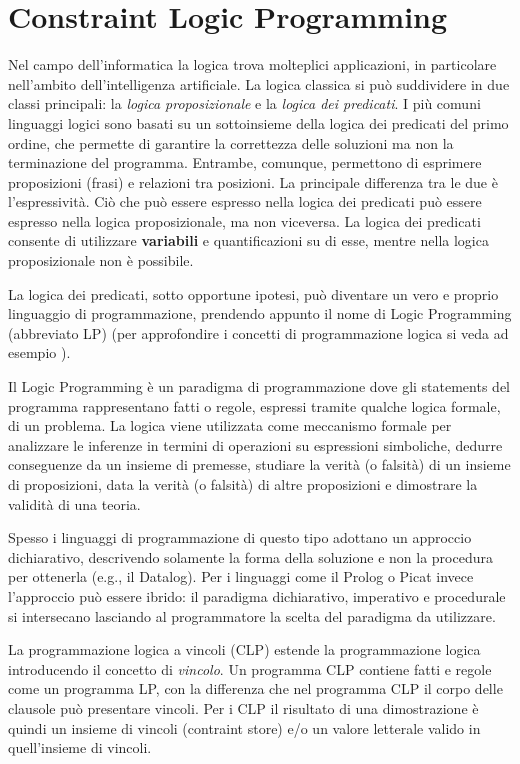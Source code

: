 \documentclass[12pt,a4paper,openright]{book} %
\begin{document}
\section{Constraint Logic Programming}
\label{sec:constraint_logic_programming}

Nel campo dell'informatica la logica trova molteplici applicazioni, in particolare nell'ambito dell'intelligenza artificiale. La logica classica si può suddividere in due classi principali: la \emph{logica proposizionale} e la \emph{logica dei predicati}.  I più comuni linguaggi logici sono basati su un sottoinsieme della logica dei predicati del primo ordine, che permette di garantire la correttezza delle soluzioni ma non la terminazione del programma. Entrambe, comunque, permettono di esprimere proposizioni (frasi) e relazioni tra posizioni. La principale differenza tra le due è l'espressività. Ciò che può essere espresso nella logica dei predicati può essere espresso nella logica proposizionale, ma non viceversa. La logica dei predicati consente di utilizzare \textbf{variabili} e quantificazioni su di esse, mentre nella logica proposizionale non è possibile.

La logica dei predicati, sotto opportune ipotesi, può diventare un vero e proprio linguaggio di programmazione, prendendo appunto il nome di Logic Programming (abbreviato LP) (per approfondire i concetti di programmazione logica si veda ad esempio \cite{Console97}).

Il Logic Programming è un paradigma di programmazione dove gli statements del programma rappresentano fatti o regole, espressi tramite qualche logica formale, di un problema. La logica viene utilizzata come meccanismo formale per analizzare le inferenze in termini di operazioni su espressioni simboliche, dedurre conseguenze da un insieme di premesse, studiare la verità (o falsità) di un insieme di proposizioni, data la verità (o falsità) di altre proposizioni e dimostrare la validità di una teoria.

Spesso i linguaggi di programmazione di questo tipo adottano un approccio dichiarativo, descrivendo solamente la forma della soluzione e non la procedura per ottenerla (e.g., il Datalog). Per i linguaggi come il Prolog o Picat invece l'approccio può essere ibrido: il paradigma dichiarativo, imperativo e procedurale si intersecano lasciando al programmatore la scelta del paradigma da utilizzare.

La programmazione logica a vincoli (CLP) estende la programmazione logica introducendo il concetto di \emph{vincolo}. Un programma CLP contiene fatti e regole come un programma LP, con la differenza che nel programma CLP il corpo delle clausole può presentare vincoli. Per i CLP il risultato di una dimostrazione è quindi un insieme di vincoli (contraint store) e/o un valore letterale valido in quell'insieme di vincoli.
\end{document}
